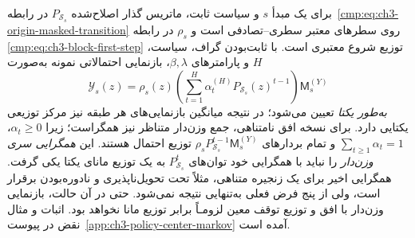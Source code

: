 برای یک مبدأ $s$ و سیاست
ثابت، ماتریس گذار اصلاح‌شده
$P_{\mathcal S_s}$
در رابطه~\eqref{cmp:eq:ch3-origin-masked-transition}
روی سطرهای معتبر سطری--تصادفی است و
$\rho_s$ در رابطه
\eqref{cmp:eq:ch3-block-first-step}
توزیع شروع معتبری است.
با ثابت‌بودن گراف، سیاست،
$H$ و پارامترهای
$\beta,\lambda$، بازنمایی
احتمالاتی نمونه به‌صورت
\begin{equation}\label{cmp:eq:ch3-policy-center-unique-walk}
\boxed{
\mathscr Y_s(z)
=\rho_s(z)
\left(\sum_{t=1}^{H}
\alpha_t^{(H)}
P_{\mathcal S_s}(z)^{t-1}\right)
\mathsf M_s^{(Y)}
}
\end{equation}
\emph{به‌طور یکتا} تعیین
می‌شود؛ در نتیجه میانگین
بازنمایی‌های هر طبقه نیز
مرکز توزیعی یکتایی دارد.
برای نسخه افق نامتناهی،
جمع وزن‌دار متناظر نیز
همگراست؛ زیرا $\alpha_t\ge0$،
$\sum_{t\ge1}\alpha_t=1$
و تمام بردارهای
$\rho_sP_{\mathcal S_s}^{t-1}
\mathsf M_s^{(Y)}$
توزیع احتمال هستند.
این \emph{همگرایی سری
وزن‌دار} را نباید با
همگرایی خود توان‌های
$P_{\mathcal S_s}^t$
به یک توزیع مانای یکتا
یکی گرفت. همگرایی اخیر
برای یک زنجیره متناهی،
مثلاً تحت تحویل‌ناپذیری
و نادوره‌بودن برقرار است،
ولی از پنج فرض فعلی
به‌تنهایی نتیجه نمی‌شود.
حتی در آن حالت،
بازنمایی وزن‌دار با
افق و توزیع توقف معین
لزومـاً برابر توزیع مانا
نخواهد بود.
اثبات و مثال نقض
در پیوست~\ref{app:ch3-policy-center-markov}
آمده است.


